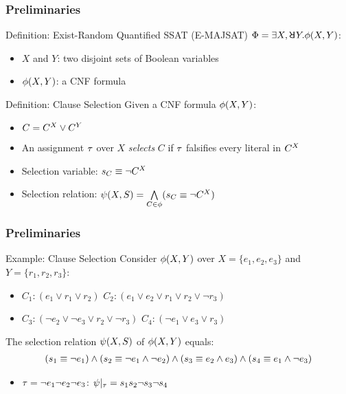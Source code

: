 \begin{frame}
    \frametitle{Preliminaries}
    \begin{block}{Definition: Exist-Random Quantified SSAT (E-MAJSAT)}
        $\Qf=\exists X,\random{} Y.\pf(X,Y)$:
        \begin{itemize}
            \item $X$ and $Y$: two disjoint sets of Boolean variables
            \item $\phi(X,Y)$: a CNF formula
        \end{itemize}
    \end{block}
    \pause
    \begin{block}{Definition: Clause Selection}
        Given a CNF formula $\phi(X,Y)$:
        \begin{itemize}
            \item $C=C^X\lor C^Y$
            \item An assignment $\tau$ over $X$ \textit{selects} $C$ if $\tau$ falsifies every literal in $C^X$
            \item Selection variable: $s_{C}\equiv\lnot C^X$
            \item Selection relation: $\psi(X,S)=\bigwedge\limits_{C\in\phi}(s_{C}\equiv\lnot C^X)$
        \end{itemize}
    \end{block}
\end{frame}

\begin{frame}
    \frametitle{Preliminaries}
    \begin{block}{Example: Clause Selection}
        Consider $\phi(X,Y)$ over $X=\{e_1,e_2,e_3\}$ and $Y=\{r_1,r_2,r_3\}$:
        \begin{itemize}
            \item[] $C_1: (e_1 \lor r_1 \lor r_2)$ $C_2: (e_1 \lor e_2 \lor r_1 \lor r_2 \lor \lnot r_3)$
            \item[] $C_3: (\lnot e_2 \lor \lnot e_3 \lor r_2 \lor \lnot r_3)$ $C_4: (\lnot e_1 \lor e_3 \lor r_3)$
        \end{itemize}
        The selection relation $\psi(X,S)$ of $\phi(X,Y)$ equals:
        \belowdisplayskip=0pt
        \begin{align*}
            (s_{1} \equiv \lnot e_1) \land
            (s_{2} \equiv \lnot e_1 \land \lnot e_2) \land
            (s_{3} \equiv e_2 \land e_3) \land
            (s_{4} \equiv e_1 \land \lnot e_3)
        \end{align*}
        \begin{itemize}
            \item $\tau=\lnot e_1 \lnot e_2 \lnot e_3$: $\psi|_{\tau}=s_1s_2\neg s_3 \neg s_4$
        \end{itemize}
    \end{block}
\end{frame}